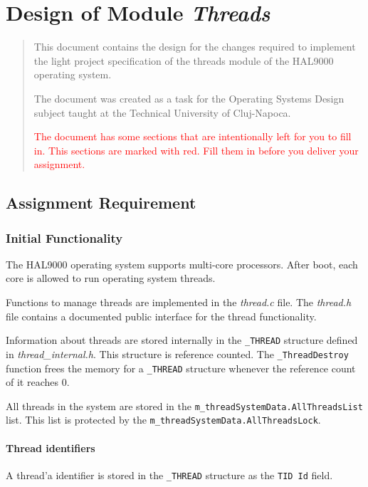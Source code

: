 
\chapter{Design of Module \textit{Threads}}

\begin{abstract}
    This document contains the design for the changes required to implement the light project specification  of the threads module of the HAL9000 operating system. 
    
    The document was created as a task for the Operating Systems Design subject taught at the Technical University of Cluj-Napoca. 
    
    \textcolor{red}{The document has some sections that are intentionally left for you to fill in. This sections are marked with red. Fill them in before you deliver your assignment.}
    
\end{abstract}


\section{Assignment Requirement}


\subsection{Initial Functionality}

    The HAL9000 operating system supports multi-core processors. After boot, each core is allowed to run operating system threads. 
        
    Functions to manage threads are implemented in the \textit{thread.c} file. The \textit{thread.h} file contains a documented public interface for the thread functionality.

    Information about threads are stored internally in the \lstinline|_THREAD| structure defined in \textit{thread\_internal.h}. This structure is reference counted. The \lstinline|_ThreadDestroy| function frees the memory for a \lstinline|_THREAD| structure whenever the reference count of it reaches 0.

    All threads in the system are stored in the \lstinline|m_threadSystemData.AllThreadsList| list. This list is protected by the \lstinline|m_threadSystemData.AllThreadsLock|.

\subsubsection{Thread identifiers}
    A thread'a identifier is stored in the \lstinline|_THREAD| structure as the \lstinline|TID Id| field. 
    
